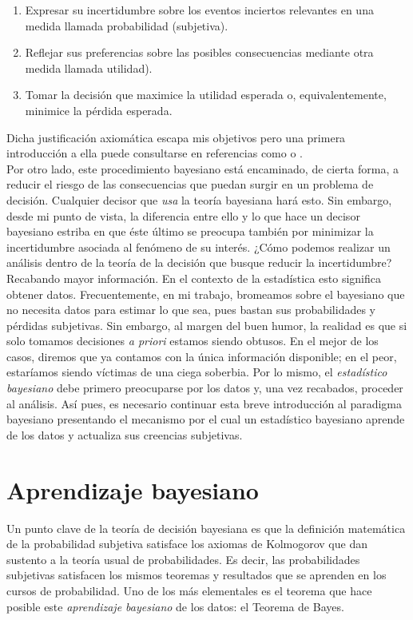 \begin{enumerate}
\item Expresar su incertidumbre sobre los eventos inciertos relevantes en una medida llamada probabilidad (subjetiva).
\item Reflejar sus preferencias sobre las posibles consecuencias mediante otra medida llamada utilidad). 
\item Tomar la decisión que maximice la utilidad esperada o, equivalentemente, minimice la pérdida esperada. 
\end{enumerate}   
	
Dicha justificación axiomática escapa mis objetivos pero una primera introducción a ella puede consultarse en referencias como \textcite{Mendoza11} o \textcite{Bernardo81}.\\

Por otro lado, este procedimiento bayesiano está encaminado, de cierta forma, a reducir el riesgo de las consecuencias que puedan surgir en un problema de decisión. Cualquier decisor que \textit{usa} la teoría bayesiana hará esto. Sin embargo, desde mi punto de vista, la diferencia entre ello y lo que hace un decisor bayesiano estriba en que éste último se preocupa también por minimizar la incertidumbre asociada al fenómeno de su interés. ¿Cómo podemos realizar un análisis dentro de la teoría de la decisión que busque reducir la incertidumbre? Recabando mayor información. En el contexto de la estadística esto significa obtener datos. Frecuentemente, en mi trabajo, bromeamos sobre el bayesiano que no necesita datos para estimar lo que sea, pues bastan sus probabilidades y pérdidas subjetivas. Sin embargo, al margen del buen humor, la realidad es que si solo tomamos decisiones \textit{a priori} estamos siendo obtusos. En el mejor de los casos, diremos que ya contamos con la única información disponible; en el peor, estaríamos siendo víctimas de una ciega soberbia. Por lo mismo, el \textit{estadístico bayesiano} debe primero preocuparse por los datos y, una vez recabados, proceder al análisis. Así pues, es necesario continuar esta breve introducción al paradigma bayesiano presentando el mecanismo por el cual un estadístico bayesiano aprende de los datos y actualiza sus creencias subjetivas.\\
	
\section{Aprendizaje bayesiano}

Un punto clave de la teoría de decisión bayesiana es que la definición matemática de la probabilidad subjetiva satisface los axiomas de Kolmogorov que dan sustento a la teoría usual de probabilidades. Es decir, las probabilidades subjetivas satisfacen los mismos teoremas y resultados que se aprenden en los cursos de probabilidad. Uno de los más elementales es el teorema que hace posible este \textit{aprendizaje bayesiano} de los datos: el Teorema de Bayes.

